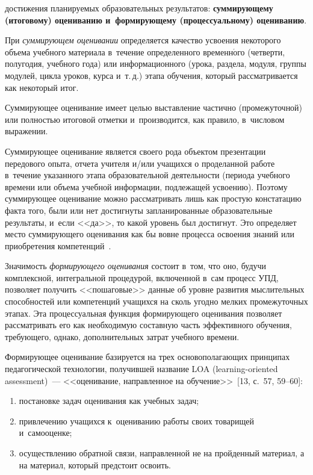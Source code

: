 \begin{multicols}{2}

\noindent
 достижения планируемых образовательных результатов: \textbf{суммирующему
(итоговому) оцениванию и~формирующему (процессуальному) оцениванию}.

  При \textit{суммирующем оценивании} определяется качество усвоения некоторого объема
учебного материа\-ла в~течение определенного временн$\acute{\mbox{о}}$го (четверти,
полугодия, учебного года) или информационного (урока, раздела, модуля, группы модулей,
цик\-ла уроков, курса и~т.\,д.) этапа обуче\-ния, который рассматривается как некоторый итог.

Сум\-ми\-ру\-ющее оценивание имеет целью вы\-став\-ле\-ние частично (промежуточной) или
пол\-ностью итоговой отметки и~производится, как правило, в~числовом выражении.

Суммирующее оценивание
является своего рода объектом презентации передового опыта, отчета учителя и/или учащихся о
проделанной работе \mbox{в~течение} указанного этапа образовательной деятельности (периода
учебного времени или объема учебной информации, подлежащей усвоению). Поэтому
суммирующее оценивание можно рас\-смат\-ри\-вать лишь как простую констатацию факта того,
\mbox{были} или нет достигнуты запланированные образовательные результаты, и~если <<да>>, то
какой уровень был достигнут. Это определяет место сум\-ми\-ру\-юще\-го оценивания как бы вовне
процесса освоения знаний или приобретения компетенций~\cite{10-kor}.

  Значимость \textit{формирующего оценивания} состоит в~том, что оно, будучи комплексной,
интегральной процедурой, включенной в~сам процесс УПД, позволяет получить
<<пошаговые>> данные об уровне развития мыслительных способностей или компетенций
учащихся на сколь угодно мелких промежуточных этапах. Эта процессуальная функция
формирующего оценивания позволяет рассматривать его как необходимую составную часть
эффективного обучения, требующего, однако, дополнительных затрат учебного времени.

  Формирующее оценивание базируется на трех основополагающих принципах
педагогической технологии, получившей название LOA (learning-oriented assessment)~---
<<оценивание, направленное на обучение>>~[13, с.~57, 59--60]:
  \begin{enumerate}[(1)]
\item постановке задач оценивания как учебных задач;
\item привлечению учащихся к~оцениванию работы своих товарищей и~самооценке;
\item осуществлению обратной связи, направленной не на пройденный материал, а на материал,
который предстоит освоить.
\end{enumerate}


\end{multicols}
